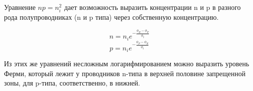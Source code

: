 Уравнение $np = n_i^2$ дает возможность выразить концентрации n и p в разного рода полупроводниках (n и p типа) через собственную концентрацию.

\begin{equation}
n = n_i e^{-\frac{\phi_E - \phi_F}{\phi_t}}
\end{equation}
\begin{equation}
p = n_i e^{-\frac{\phi_F - \phi_E}{\phi_t}}
\end{equation}

Из этих же уравнений несложным логарифмированием можно выразить уровень Ферми, который лежит у проводников n-типа в верхней половине запрещенной зоны, для p-типа, соответственно, в нижней.\\



